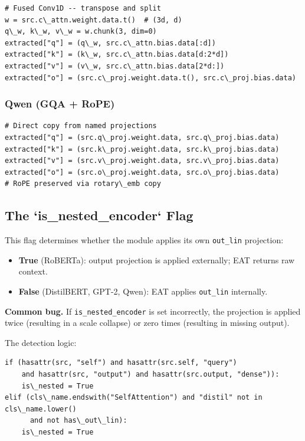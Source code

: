 \begin{lstlisting}
# Fused Conv1D -- transpose and split
w = src.c\_attn.weight.data.t()  # (3d, d)
q\_w, k\_w, v\_w = w.chunk(3, dim=0)
extracted["q"] = (q\_w, src.c\_attn.bias.data[:d])
extracted["k"] = (k\_w, src.c\_attn.bias.data[d:2*d])
extracted["v"] = (v\_w, src.c\_attn.bias.data[2*d:])
extracted["o"] = (src.c\_proj.weight.data.t(), src.c\_proj.bias.data)
\end{lstlisting}

\subsubsection{Qwen (GQA + RoPE)}

\begin{lstlisting}
# Direct copy from named projections
extracted["q"] = (src.q\_proj.weight.data, src.q\_proj.bias.data)
extracted["k"] = (src.k\_proj.weight.data, src.k\_proj.bias.data)
extracted["v"] = (src.v\_proj.weight.data, src.v\_proj.bias.data)
extracted["o"] = (src.o\_proj.weight.data, src.o\_proj.bias.data)
# RoPE preserved via rotary\_emb copy
\end{lstlisting}

\subsection{The `is\_nested\_encoder` Flag}

This flag determines whether the module applies its own \texttt{out\_lin} projection:

\begin{itemize}
\item \textbf{True} (RoBERTa): output projection is applied externally; EAT returns
  raw context.
\item \textbf{False} (DistilBERT, GPT-2, Qwen): EAT applies \texttt{out\_lin} internally.

\end{itemize}
\textbf{Common bug.} If \texttt{is\_nested\_encoder} is set incorrectly, the projection 
is applied twice (resulting in a scale collapse) or zero times (resulting 
in missing output).

The detection logic:

\begin{lstlisting}
if (hasattr(src, "self") and hasattr(src.self, "query")
    and hasattr(src, "output") and hasattr(src.output, "dense")):
    is\_nested = True
elif (cls\_name.endswith("SelfAttention") and "distil" not in cls\_name.lower()
      and not has\_out\_lin):
    is\_nested = True
\end{lstlisting}

